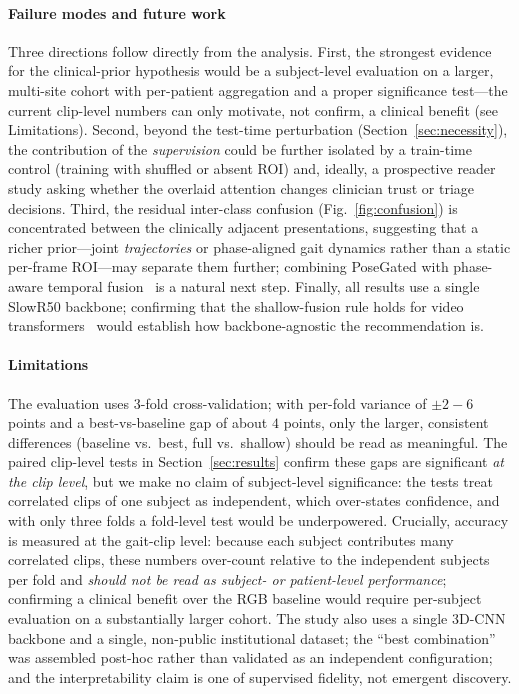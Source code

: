 \documentclass[review,authoryear,times]{elsarticle}
\begin{document}
\paragraph{Failure modes and future work}
Three directions follow directly from the analysis. First, the strongest evidence
for the clinical-prior hypothesis would be a subject-level evaluation on a larger,
multi-site cohort with per-patient aggregation and a proper significance test---the
current clip-level numbers can only motivate, not confirm, a clinical benefit
(see Limitations). Second, beyond the test-time perturbation
(Section~\ref{sec:necessity}), the contribution of the \emph{supervision} could be
further isolated by a train-time control (training with shuffled or absent ROI)
and, ideally, a prospective reader study asking whether the overlaid attention
changes clinician trust or triage decisions. Third, the residual
inter-class confusion (Fig.~\ref{fig:confusion}) is concentrated between the
clinically adjacent presentations, suggesting that a richer prior---joint
\emph{trajectories} or phase-aligned gait dynamics rather than a static per-frame
ROI---may separate them further; combining PoseGated with phase-aware temporal
fusion~\citep{chen2024phasemix} is a natural next step. Finally, all results use a
single {SlowR50} backbone; confirming that the shallow-fusion rule holds for video
transformers~\citep{arnab2021vivit,bertasius2021timesformer} would establish how
backbone-agnostic the recommendation is.

\paragraph{Limitations}
The evaluation uses 3-fold cross-validation; with per-fold variance of
$\pm 2\!-\!6$ points and a best-vs-baseline gap of about $4$ points, only the
larger, consistent differences (baseline vs.\ best, full vs.\ shallow) should be
read as meaningful. The paired clip-level tests in Section~\ref{sec:results}
confirm these gaps are significant \emph{at the clip level}, but we make no claim
of subject-level significance: the tests treat correlated clips of one subject as
independent, which over-states confidence, and with only three folds a
fold-level test would be underpowered. Crucially, accuracy is measured at the
gait-clip level: because each subject
contributes many correlated clips, these numbers over-count relative to the
independent subjects per fold and \emph{should not be read as subject- or
patient-level performance}; confirming a clinical benefit over the RGB baseline
would require per-subject evaluation on a substantially larger cohort. The study
also uses a single 3D-CNN backbone and a single, non-public institutional
dataset; the ``best combination'' was assembled post-hoc rather than validated as
an independent configuration; and the interpretability claim is one of supervised
fidelity, not emergent discovery.
\end{document}
